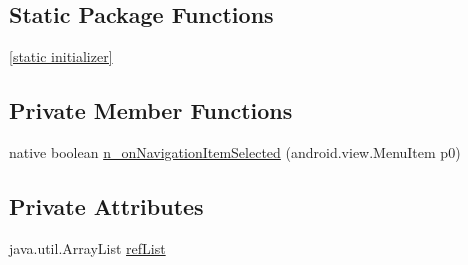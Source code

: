 \subsection*{Static Package Functions}
\begin{CompactItemize}
\item 
\hyperlink{classmono_1_1android_1_1support_1_1design_1_1widget_1_1_bottom_navigation_view___on_navigation_ie9d71c6c186664ed279b77f9f21d9a3f_a038601cc80c58b07d65e8ffedef4c31}{\mbox{[}static initializer\mbox{]}}
\end{CompactItemize}
\subsection*{Private Member Functions}
\begin{CompactItemize}
\item 
native boolean \hyperlink{classmono_1_1android_1_1support_1_1design_1_1widget_1_1_bottom_navigation_view___on_navigation_ie9d71c6c186664ed279b77f9f21d9a3f_1a384cf7548868e4ce2bd123fd74481c}{n\_\-onNavigationItemSelected} (android.view.MenuItem p0)
\end{CompactItemize}
\subsection*{Private Attributes}
\begin{CompactItemize}
\item 
java.util.ArrayList \hyperlink{classmono_1_1android_1_1support_1_1design_1_1widget_1_1_bottom_navigation_view___on_navigation_ie9d71c6c186664ed279b77f9f21d9a3f_313fed3afa2c87d2876c8041fc731c95}{refList}
\end{CompactItemize}


